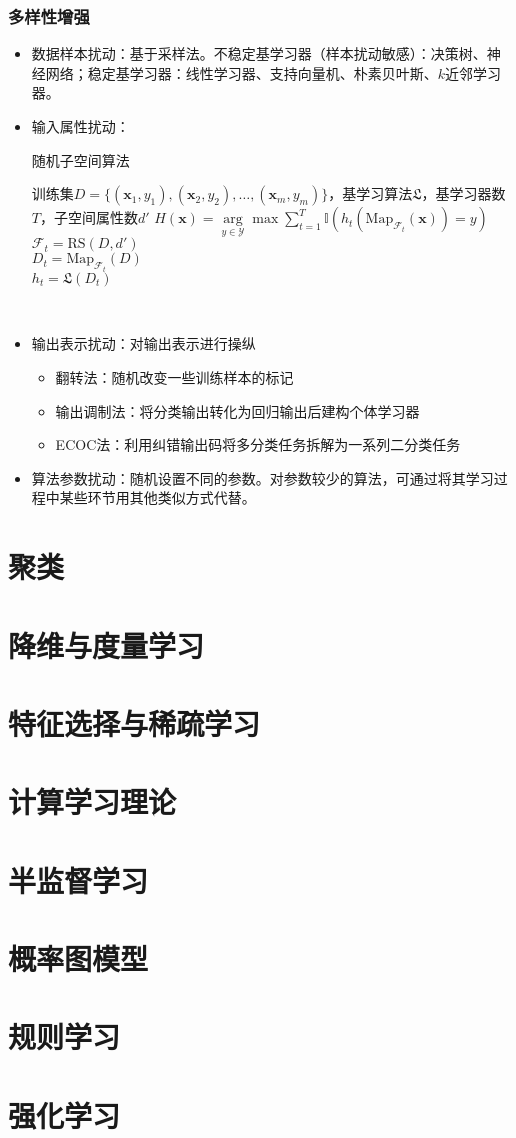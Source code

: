 \documentclass{ctexart}
\begin{document}
 					\subsubsection{多样性增强}
 						\begin{itemize}
 							\item 数据样本扰动：基于采样法。不稳定基学习器（样本扰动敏感）：决策树、神经网络；稳定基学习器：线性学习器、支持向量机、朴素贝叶斯、$k$近邻学习器。
 							\item 输入属性扰动：\begin{algorithm}
 								\caption{随机子空间算法}
 								\begin{algorithmic}[1]
 									\REQUIRE 训练集$D=\{(\bm{x}_1,y_1),(\bm{x}_2,y_2),\dots,(\bm{x}_m,y_m)\}$，基学习算法$\mathfrak{L}$，基学习器数$T$，子空间属性数$d'$
 									\ENSURE $H(\bm{x})=\arg\limits_{y\in\mathcal{Y}}\max\sum_{t=1}^{T}\mathbb{I}(h_t(\mathrm{Map}_{\mathcal{F}_t}(\bm{x}))=y)$
 										\STATE $\mathcal{F}_t=\mathrm{RS}(D,d')$\\
 										\STATE $D_t=\mathrm{Map}_{\mathcal{F}_t}(D)$\\
 										\STATE $h_t=\mathfrak{L}(D_t)$\\
 									\ENDFOR
 								\end{algorithmic} 
 							\end{algorithm}
 							\item 输出表示扰动：对输出表示进行操纵\begin{itemize}
 								\item 翻转法：随机改变一些训练样本的标记
 								\item 输出调制法：将分类输出转化为回归输出后建构个体学习器
 								\item ECOC法：利用纠错输出码将多分类任务拆解为一系列二分类任务
 							\end{itemize}
 							\item 算法参数扰动：随机设置不同的参数。对参数较少的算法，可通过将其学习过程中某些环节用其他类似方式代替。
 						\end{itemize}
			\section{聚类}
			\section{降维与度量学习}
			\section{特征选择与稀疏学习}
			\section{计算学习理论}
			\section{半监督学习}
			\section{概率图模型}
			\section{规则学习}
			\section{强化学习}
			
\end{document}
